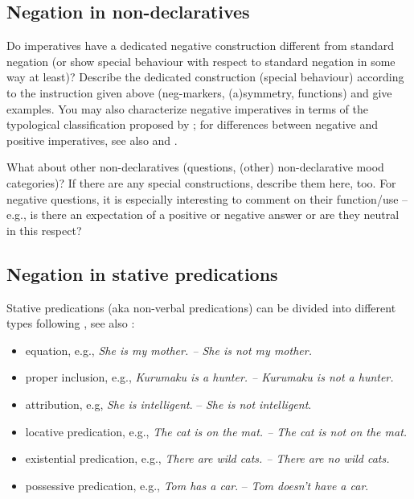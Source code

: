 \documentclass[output=paper,colorlinks,citecolor=brown]{langscibook}
\begin{document}
\subsection{Negation in non-declaratives}\label{sec:quest:2.2}

Do imperatives have a dedicated negative construction different from standard negation (or show special behaviour with respect to standard negation in some way at least)? Describe the dedicated construction (special behaviour) according to the instruction given above (neg-markers, (a)symmetry, functions) and give examples. You may also characterize negative imperatives in terms of the typological classification proposed by \citet{AuweraEtAl2013}; for differences between negative and positive imperatives, see also \citealt{MiestamoAuwera2007} and \citealt{Aikhenvald2010}. 


What about other non-declaratives (questions, (other) non-declarative mood categories)? If there are any special constructions, describe them here, too. For negative questions, it is especially interesting to comment on their function/use – e.g., is there an expectation of a positive or negative answer or are they neutral in this respect? 

\subsection{Negation in stative predications}\label{sec:quest:2.3}

Stative predications (aka non-verbal predications) can be divided into different types following \citet[111ff]{Payne1997}, see also \citet{Veselinova2014}:

\begin{itemize}
    \item equation, e.g., \textit{She is my mother. – She is not my mother.}
    \item proper inclusion, e.g., \textit{Kurumaku is a hunter. – Kurumaku is not a hunter.}
    \item attribution, e.g, \textit{She is intelligent}. – \textit{She is not intelligent}.
    \item locative predication, e.g., \textit{The cat is on the mat. – The cat is not on the mat.}
    \item existential predication, e.g., \textit{There are wild cats. – There are no wild cats.}
    \item possessive predication, e.g., \textit{Tom has a car}. – \textit{Tom doesn’t have a car}.
\end{itemize}
\end{document}
